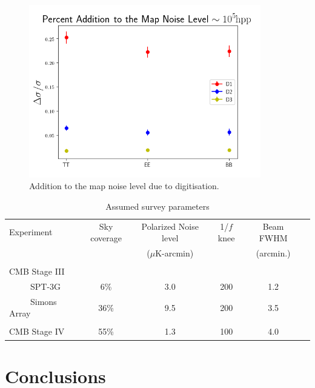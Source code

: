 \documentclass[apj]{emulateapj}
\begin{document}
\begin{figure}[htb]\centering
\includegraphics[width=0.9\textwidth,clip]{Plots/addednoise.png}
  \caption[Current ]{
  Addition to the map noise level due to digitisation. 
           \label{fig:extranoise}
  }
\end{figure}

\begin{table}[tbh]
\begin{center}
\caption{\label{tab:experiments} Assumed survey parameters}
\small
\begin{tabular}{l || c c c c c }
Experiment & Sky coverage & Polarized Noise level  & 1/$f$ knee & Beam FWHM \\
& &($\mu$K-arcmin)&&(arcmin.)\\
\hline
\tiny \\ \small
CMB Stage III & & & & \\
~~~~~SPT-3G & 6\% & 3.0 & 200 & 1.2 \\
~~~~~Simons Array & 36\% & 9.5 & 200 & 3.5 \\ 
\tiny \\ \small
CMB Stage IV & 55\% & 1.3 & 100 & 4.0 \\
\end{tabular}
 \normalsize
\end{center}
\end{table}

\section{Conclusions}
\label{sec:conclusions}
\end{document}
